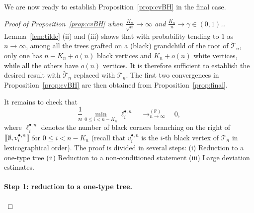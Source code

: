\documentclass[10pt]{amsart}
\theoremstyle{definition}\newtheorem{defi}[theo]{Definition}\newtheorem{rema}[theo]{Remark}\newtheorem{exam}[theo]{Example}\newtheorem{exem}[theo]{Example}\newtheorem{nota}[theo]{Notation}
\renewcommand{\P}{\mathbb{P}}
\def\tTs{\tilde{\Ts}}
\def\Ts{\mathscr{T}}
\def\llbracket{[\hspace{-.10em} [ }
\begin{document}
We are now ready to establish Proposition~\ref{prop:cvBH} in the final case.

\begin{proof}[Proof of  Proposition~\ref{prop:cvBH}  when $\tfrac{K_{n}}{\sqrt{n}} \rightarrow \infty$ and $ \tfrac{K_{n}}{n}  \rightarrow \gamma \in (0,1)$.]
Lemma~\ref{lem:tilde} (ii) and (iii) shows that with probability tending to $1$ as $n \rightarrow \infty$, among all the trees grafted on a (black) grandchild of the root of $\tTs_{n}$, only one has $n-K_{n}+o(n)$ black vertices and $K_{n}+o(n)$ white vertices, while all the others have $o(n)$ vertices. It is therefore sufficient to establish the desired result with $\tTs_{n}$ replaced with $\Ts_{n}$.  The first two convergences in  Proposition~\ref{prop:cvBH}  are then obtained from Proposition~\ref{prop:final}.

It remains to check that
\[ \frac{1}{n} \min_{0 \leq i < n-K_{n}} \ell^{\bullet,n}_{i}  \quad \mathop{\longrightarrow}^{(\P)}_{n \rightarrow \infty} \quad 0,\]
where $\ell^{\bullet,n}_{i}$ denotes  the number of black corners  branching on the right of  $\llbracket \emptyset, v^{\bullet,n}_{i} \llbracket$ for $0 \leq i < n-K_{n}$ (recall that $v^{\bullet,n}_{i} $ is the $i$-th black vertex of $\Ts_{n}$ in lexicographical order).
The proof is divided in several steps: (i) Reduction to a one-type tree (ii) Reduction to a non-conditioned statement (iii) Large deviation estimates.

\paragraph*{Step 1: reduction to a one-type tree.}

\begin{figure}[t] \centering
\begin{scriptsize}
\end{scriptsize}
\end{figure}
\end{proof}
\end{document}
